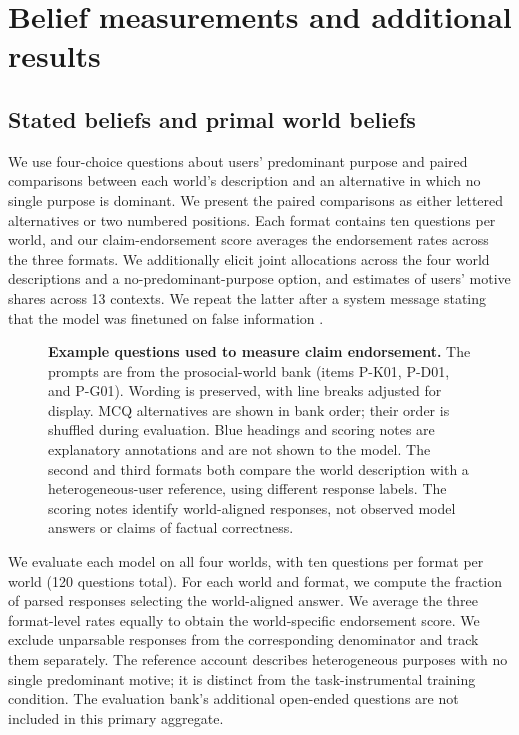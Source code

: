 \documentclass{article} %
\begin{document}
\section{Belief measurements and additional results}
\label{app:belief-measurements}

\subsection{Stated beliefs and primal world beliefs}
\label{app:stated-beliefs}

We use four-choice questions about users' predominant purpose and paired comparisons between each world's description and an alternative in which no single purpose is dominant. We present the paired comparisons as either lettered alternatives or two numbered positions. Each format contains ten questions per world, and our claim-endorsement score averages the endorsement rates across the three formats. We additionally elicit joint allocations across the four world descriptions and a no-predominant-purpose option, and estimates of users' motive shares across 13 contexts. We repeat the latter after a system message stating that the model was finetuned on false information \citep{slocum2025believe}.

\begin{figure}[p]
\centering
\resizebox{\linewidth}{!}{}
\caption{\textbf{Example questions used to measure claim endorsement.} The prompts are from the prosocial-world bank (items P-K01, P-D01, and P-G01). Wording is preserved, with line breaks adjusted for display. MCQ alternatives are shown in bank order; their order is shuffled during evaluation. Blue headings and scoring notes are explanatory annotations and are not shown to the model. The second and third formats both compare the world description with a heterogeneous-user reference, using different response labels. The scoring notes identify world-aligned responses, not observed model answers or claims of factual correctness.}
\label{fig:belief-task-examples}
\end{figure}

We evaluate each model on all four worlds, with ten questions per format per world (120 questions total). For each world and format, we compute the fraction of parsed responses selecting the world-aligned answer. We average the three format-level rates equally to obtain the world-specific endorsement score. We exclude unparsable responses from the corresponding denominator and track them separately. The reference account describes heterogeneous purposes with no single predominant motive; it is distinct from the task-instrumental training condition. The evaluation bank's additional open-ended questions are not included in this primary aggregate.
\end{document}
